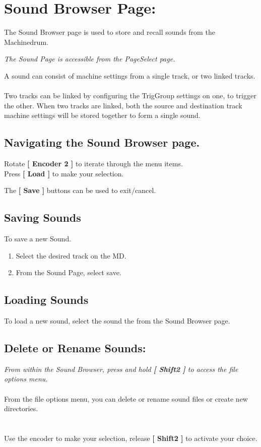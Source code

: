 \chapter{Sound Browser Page:}
The Sound Browser page is used to store and recall sounds from the Machinedrum.

 \textit{The Sound Page is accessible from the PageSelect page.}


A sound can consist of machine settings from a single track, or two linked tracks.\\
\\
Two tracks can be linked by configuring the TrigGroup settings on one, to trigger the other. When two tracks are linked, both the source and destination track machine settings will be stored together to form a single sound.


 \section{Navigating the Sound Browser page.}
Rotate \textbf{[ Encoder 2 ]} to iterate through the menu items.\\
Press \textbf{[ Load ]} to make your selection.

The \textbf{[ Save ]} buttons can be used to exit/cancel.
 
 \section{Saving Sounds}
 To save a new Sound. 
\begin{enumerate}
 \item Select the desired track on the MD.
 \item From the Sound Page, select save.
\end{enumerate}
\section{Loading Sounds}
To load a new sound, select the sound the from the Sound Browser page.
\newpage
\section{Delete or Rename Sounds:}
\textit{From within the Sound Browser, press and hold \textbf{[ Shift2 ]} to access the file options menu.}\\\\
From the file options menu, you can delete or rename sound files or create new directories.\\\\\\
Use the encoder to make your selection, release \textbf{[ Shift2 ]} to activate your choice.
